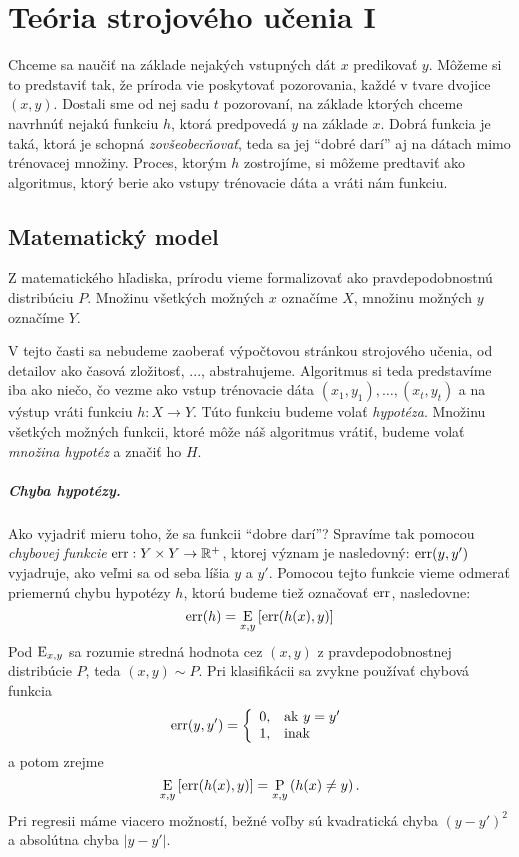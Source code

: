 \chapter{Teória strojového učenia I}

Chceme sa naučiť na základe nejakých vstupných dát $x$ predikovať $y$.
Môžeme si to predstaviť tak, že príroda vie poskytovať pozorovania,
každé v tvare dvojice $(x, y)$. Dostali sme od nej sadu $t$ pozorovaní,
na základe ktorých chceme navrhnúť nejakú funkciu $h$, ktorá predpovedá
$y$ na základe $x$. Dobrá funkcia je taká, ktorá je schopná
\emph{zovšeobecňovať}, teda sa jej ``dobré darí'' aj na dátach mimo
trénovacej množiny. Proces, ktorým $h$ zostrojíme, si môžeme predtaviť
ako algoritmus, ktorý berie ako vstupy trénovacie dáta a vráti nám
funkciu.




\section{Matematický model}

Z matematického hľadiska, prírodu vieme formalizovať ako
pravdepodobnostnú distribúciu $P$. Množinu všetkých možných
$x$ označíme $X$, množinu možných $y$ označíme $Y$.

V tejto časti sa nebudeme zaoberať výpočtovou stránkou strojového
učenia, od detailov ako časová zložitosť, ..., abstrahujeme. Algoritmus
si teda predstavíme iba ako niečo, čo vezme ako vstup trénovacie dáta
$(x_1, y_1), \ldots, (x_t, y_t)$ a na výstup vráti funkciu
$h : X \to Y$. Túto funkciu budeme volať \emph{hypotéza}. Množinu
všetkých možných funkcii, ktoré môže náš algoritmus vrátiť,
budeme volať \emph{množina hypotéz} a značiť ho $H$.

\paragraph{Chyba hypotézy.}
Ako vyjadriť mieru toho, že sa funkcii ``dobre darí''? Spravíme tak
pomocou \emph{chybovej funkcie} $\mathrm{err} : Y \times Y \to \mathbb{R}^+$,
ktorej význam je nasledovný: $\mathrm{err}(y, y')$ vyjadruje, ako veľmi
sa od seba líšia $y$ a $y'$. Pomocou tejto funkcie vieme odmerať
priemernú chybu hypotézy $h$, ktorú budeme tiež označovať $\mathrm{err}$,
nasledovne:
$$\mathrm{err}(h) = \operatorname*{\mathrm{E}}_{x, y} \left[ \mathrm{err}(h(x), y) \right]$$
Pod $\operatorname*{\mathrm{E}}_{x, y}$ sa rozumie stredná hodnota cez $(x, y)$
z pravdepodobnostnej distribúcie $P$, teda $(x, y) \sim P$.
Pri klasifikácii sa zvykne používať chybová funkcia
$$
  \mathrm{err}(y, y') = \left\{
    \begin{array}{ll}
      0, & \text{ak}\ y = y' \\
      1, & \text{inak}
    \end{array}
  \right.
$$
a potom zrejme
$$\operatorname*{\mathrm{E}}_{x, y} \left[ \mathrm{err}(h(x), y) \right] = \operatorname*{\mathrm{P}}_{x, y} \left( h(x) \neq y \right).$$
Pri regresii máme viacero možností, bežné voľby sú kvadratická chyba
$(y - y')^2$ a absolútna chyba $|y - y'|$.

